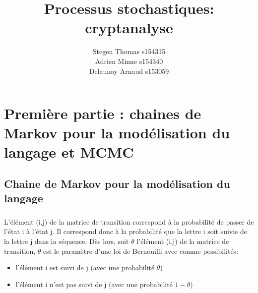 \documentclass[11pt]{report}
\title{Processus stochastiques: cryptanalyse}
\author{Stegen Thomas s154315 \\ Adrien Minne s154340 \\ Delaunoy Arnaud s153059}
\date{}
\begin{document}
\setcounter{secnumdepth}{3}

\begin{titlepage}
\maketitle
\end{titlepage}
\section{ Première partie : chaines de Markov pour la modélisation du langage et MCMC}
\subsection{Chaine de Markov pour la modélisation du langage}
\subsubsection{}
L'élément (i,j) de la matrice de transition correspond à la probabilité de passer de l'état i à l'état j. Il correspond donc à la probabilité que la lettre i soit suivie de la lettre j dans la séquence. Dès lors, soit $\theta$ l'élément (i,j) de la matrice de transition, $\theta$ est le paramètre d'une loi de Bernouilli avec comme possibilités:
\begin{itemize}
\item l'élément i est suivi de j (avec une probabilité $\theta$)
\item l'élément i n'est pas suivi de j (avec une probabilité $1-\theta$)
\end{itemize}
\end{document}
